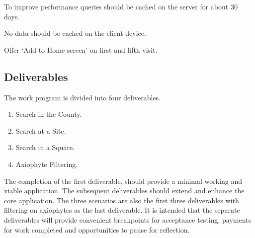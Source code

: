 \documentclass[a4paper,12pt,landscape]{article}
\begin{document}
\begin{multicols*}{2}
  \begin{todolist}
    \item To improve performance queries should be cached on the server for about 30 days.
    \item No data should be cached on the client device.
    \item Offer `Add to Home screen' on first and fifth visit.
  \end{todolist}

  \subsection{Deliverables}
  The work program is divided into four deliverables.

  \begin{enumerate}[noitemsep] 
    \item Search in the County.
    \item Search at a Site.
    \item Search in a Square.
    \item Axiophyte Filtering.
  \end{enumerate}

  The completion of the first deliverable,
  should provide a minimal working and viable application.
  The subsequent deliverables should extend and enhance the core application.
  The three scenarios are also the first three deliverables
  with filtering on axiophytes as the last deliverable.
  It is intended that the separate deliverables will provide convenient
  breakpoints for acceptance testing, 
  payments for work completed
  and 
  opportunities to pause for reflection.
\end{multicols*}
\end{document}
